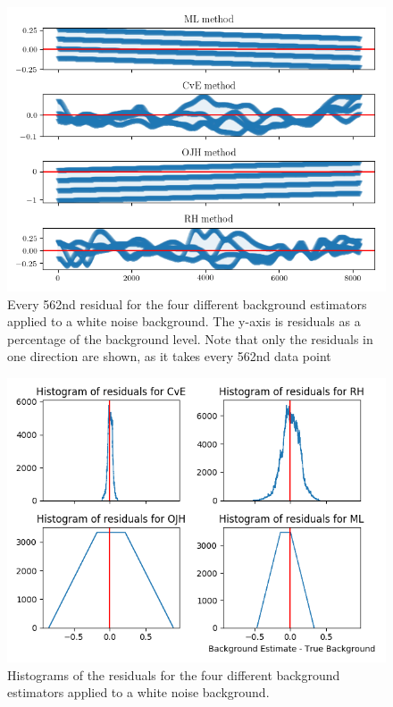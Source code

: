 \documentclass[10pt, a4paper]{article}
\begin{document}
\begin{figure}[h!]
\centering
\includegraphics[width=0.49\textheight]{residual_flatgauss}
\caption{Every 562nd residual for the four different background estimators applied to a white noise background. The y-axis is residuals as a percentage of the background level. Note that only the residuals in one direction are shown, as it takes every 562nd data point}
\label{fig:residual_flatgauss}
\end{figure}

\begin{figure}[h!]
\centering
\includegraphics[width=0.49\textheight]{histogram_flatgauss}
\caption{Histograms of the residuals for the four different background estimators applied to a white noise background.}
\label{fig:histogram_flatgauss}
\end{figure}
\end{document}
